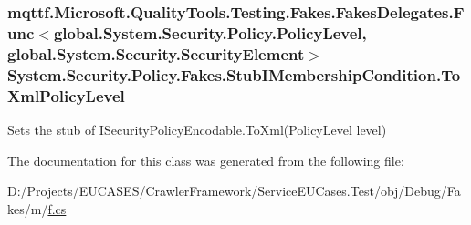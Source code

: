 \hypertarget{class_system_1_1_security_1_1_policy_1_1_fakes_1_1_stub_i_membership_condition_a3f2a7b29a20e8274b27d7070d46e20fe}{
\subsubsection[{To\-Xml\-Policy\-Level}]{\setlength{\rightskip}{0pt plus 5cm}mqttf.\-Microsoft.\-Quality\-Tools.\-Testing.\-Fakes.\-Fakes\-Delegates.\-Func$<$global.\-System.\-Security.\-Policy.\-Policy\-Level, global.\-System.\-Security.\-Security\-Element$>$ System.\-Security.\-Policy.\-Fakes.\-Stub\-I\-Membership\-Condition.\-To\-Xml\-Policy\-Level}}\label{class_system_1_1_security_1_1_policy_1_1_fakes_1_1_stub_i_membership_condition_a3f2a7b29a20e8274b27d7070d46e20fe}


Sets the stub of I\-Security\-Policy\-Encodable.\-To\-Xml(\-Policy\-Level level)



The documentation for this class was generated from the following file\-:\begin{DoxyCompactItemize}
\item 
D\-:/\-Projects/\-E\-U\-C\-A\-S\-E\-S/\-Crawler\-Framework/\-Service\-E\-U\-Cases.\-Test/obj/\-Debug/\-Fakes/m/\hyperlink{m_2f_8cs}{f.\-cs}\end{DoxyCompactItemize}
